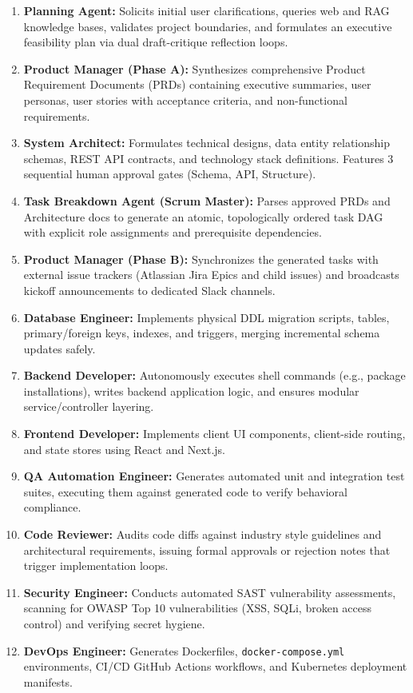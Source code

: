 \documentclass[10pt,journal,compsoc]{IEEEtran}
\begin{document}
\begin{enumerate}
    \item \textbf{Planning Agent:} Solicits initial user clarifications, queries web and RAG knowledge bases, validates project boundaries, and formulates an executive feasibility plan via dual draft-critique reflection loops.
    \item \textbf{Product Manager (Phase A):} Synthesizes comprehensive Product Requirement Documents (PRDs) containing executive summaries, user personas, user stories with acceptance criteria, and non-functional requirements.
    \item \textbf{System Architect:} Formulates technical designs, data entity relationship schemas, REST API contracts, and technology stack definitions. Features 3 sequential human approval gates (Schema, API, Structure).
    \item \textbf{Task Breakdown Agent (Scrum Master):} Parses approved PRDs and Architecture docs to generate an atomic, topologically ordered task DAG with explicit role assignments and prerequisite dependencies.
    \item \textbf{Product Manager (Phase B):} Synchronizes the generated tasks with external issue trackers (Atlassian Jira Epics and child issues) and broadcasts kickoff announcements to dedicated Slack channels.
    \item \textbf{Database Engineer:} Implements physical DDL migration scripts, tables, primary/foreign keys, indexes, and triggers, merging incremental schema updates safely.
    \item \textbf{Backend Developer:} Autonomously executes shell commands (e.g., package installations), writes backend application logic, and ensures modular service/controller layering.
    \item \textbf{Frontend Developer:} Implements client UI components, client-side routing, and state stores using React and Next.js.
    \item \textbf{QA Automation Engineer:} Generates automated unit and integration test suites, executing them against generated code to verify behavioral compliance.
    \item \textbf{Code Reviewer:} Audits code diffs against industry style guidelines and architectural requirements, issuing formal approvals or rejection notes that trigger implementation loops.
    \item \textbf{Security Engineer:} Conducts automated SAST vulnerability assessments, scanning for OWASP Top 10 vulnerabilities (XSS, SQLi, broken access control) and verifying secret hygiene.
    \item \textbf{DevOps Engineer:} Generates Dockerfiles, \texttt{docker-compose.yml} environments, CI/CD GitHub Actions workflows, and Kubernetes deployment manifests.
\end{enumerate}
\end{document}
